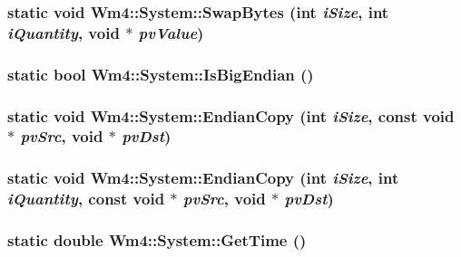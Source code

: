 \subsubsection{\setlength{\rightskip}{0pt plus 5cm}static void Wm4::System::Swap\-Bytes (int {\em i\-Size}, int {\em i\-Quantity}, void $\ast$ {\em pv\-Value})\hspace{0.3cm}{\tt  [static]}}\label{classWm4_1_1System_4d72f4992514ce404cd4896f1fdc8aa4}


\subsubsection{\setlength{\rightskip}{0pt plus 5cm}static bool Wm4::System::Is\-Big\-Endian ()\hspace{0.3cm}{\tt  [static]}}\label{classWm4_1_1System_8a732286323936a8d1b259dcbadbb840}


\subsubsection{\setlength{\rightskip}{0pt plus 5cm}static void Wm4::System::Endian\-Copy (int {\em i\-Size}, const void $\ast$ {\em pv\-Src}, void $\ast$ {\em pv\-Dst})\hspace{0.3cm}{\tt  [static]}}\label{classWm4_1_1System_90f08ebd7dd7af09479e1277f7126523}


\subsubsection{\setlength{\rightskip}{0pt plus 5cm}static void Wm4::System::Endian\-Copy (int {\em i\-Size}, int {\em i\-Quantity}, const void $\ast$ {\em pv\-Src}, void $\ast$ {\em pv\-Dst})\hspace{0.3cm}{\tt  [static]}}\label{classWm4_1_1System_8245e37e2d2f5a98788106e242e6277d}


\subsubsection{\setlength{\rightskip}{0pt plus 5cm}static double Wm4::System::Get\-Time ()\hspace{0.3cm}{\tt  [static]}}\label{classWm4_1_1System_3ff19ffa86de311957c3b94fc4c86197}


